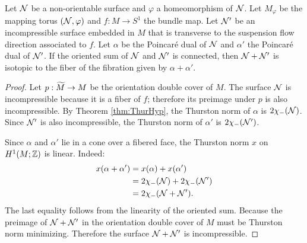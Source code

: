 \begin{thm}
  \label{thm:oriented-sum}
  Let $\mathcal{N}$ be a non-orientable surface and $\varphi$ a homeomorphism of $\mathcal{N}$.  Let $M_\varphi$ be the mapping torus $(\mathcal{N},\varphi)$ and $f:M\rightarrow S^1$ the bundle map.  Let $\mathcal{N}'$ be an incompressible surface embedded in $M$ that is transverse to the suspension flow direction associated to $f$.  Let $\alpha$ be the Poincar\'e dual of $\mathcal{N}$ and $\alpha'$ the Poincar\'e dual of $\mathcal{N}'$. If the oriented sum of $\mathcal{N}$ and $\mathcal{N}'$ is connected, then
  $\mathcal{N} + \mathcal{N}'$ is isotopic to the fiber of the fibration given by $\alpha + \alpha'$.
\end{thm}
\begin{proof}
  Let $p:\widetilde{M}\rightarrow M$ be the orientation double cover of $M$.  %
  The surface $\mathcal{N}$ is incompressible because it is a fiber of $f$; therefore its preimage under $p$ is also incompressible.  By Theorem \ref{thm:ThurHyp}, the Thurston norm of $\alpha$ is 
  $2\chi_-(\mathcal{N})$.  Since $\mathcal{N}'$ is also incompressible, the Thurston norm of $\alpha'$ is $2\chi_-(\mathcal{N}')$.

  Since $\alpha$ and $\alpha'$ lie in a cone over a fibered face, the Thurston norm $x$ on $H^1(M;\mathbb{Z})$ is linear.  Indeed:
  \begin{align*}
    x(\alpha + \alpha') &= x(\alpha) + x(\alpha') \\
                        &= 2\chi_-(\mathcal{N}) + 2\chi_-(\mathcal{N}') \\
                        &= 2\chi_-(\mathcal{N} + \mathcal{N}').
  \end{align*}
  The last equality follows from the linearity of the oriented sum. Because the preimage of $\mathcal{N} + \mathcal{N}'$ in the orientation double cover of $M$ must be Thurston norm minimizing.  Therefore the surface $\mathcal{N}+\mathcal{N}'$ is incompressible.


\end{proof}
